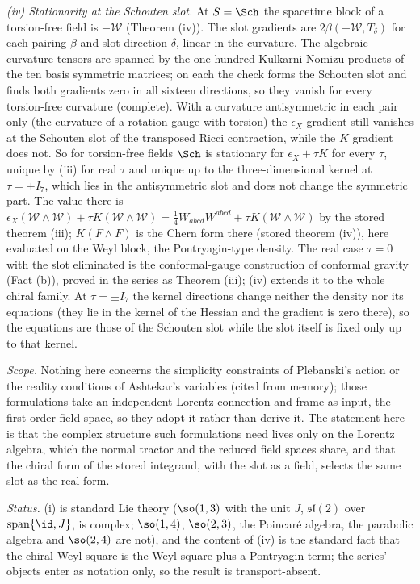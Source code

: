 \emph{(iv) Stationarity at the Schouten slot.} At $S = \Sch$ the spacetime block of a torsion-free field is $-\mathcal{W}$ (Theorem (iv)). The slot gradients are $2\beta(-\mathcal{W}, T_{\delta})$ for each pairing $\beta$ and slot direction $\delta$, linear in the curvature. The algebraic curvature tensors are spanned by the one hundred Kulkarni-Nomizu products of the ten basis symmetric matrices; on each the check forms the Schouten slot and finds both gradients zero in all sixteen directions, so they vanish for every torsion-free curvature (complete). With a curvature antisymmetric in each pair only (the curvature of a rotation gauge with torsion) the $\epsilon_{X}$ gradient still vanishes at the Schouten slot of the transposed Ricci contraction, while the $K$ gradient does not. So for torsion-free fields $\Sch$ is stationary for $\epsilon_{X} + \tau K$ for every $\tau$, unique by (iii) for real $\tau$ and unique up to the three-dimensional kernel at $\tau = \pm I_{7}$, which lies in the antisymmetric slot and does not change the symmetric part. The value there is $\epsilon_{X}(\mathcal{W} \wedge \mathcal{W}) + \tau K(\mathcal{W} \wedge \mathcal{W}) = \tfrac14 W_{abcd}W^{abcd} + \tau K(\mathcal{W} \wedge \mathcal{W})$ by the stored theorem (iii); $K(F \wedge F)$ is the Chern form there (stored theorem (iv)), here evaluated on the Weyl block, the Pontryagin-type density. The real case $\tau = 0$ with the slot eliminated is the conformal-gauge construction of conformal gravity (Fact (b)), proved in the series as Theorem (iii); (iv) extends it to the whole chiral family. At $\tau = \pm I_{7}$ the kernel directions change neither the density nor its equations (they lie in the kernel of the Hessian and the gradient is zero there), so the equations are those of the Schouten slot while the slot itself is fixed only up to that kernel.

\emph{Scope.} Nothing here concerns the simplicity constraints of Plebanski's action or the reality conditions of Ashtekar's variables (cited from memory); those formulations take an independent Lorentz connection and frame as input, the first-order field space, so they adopt it rather than derive it. The statement here is that the complex structure such formulations need lives only on the Lorentz algebra, which the normal tractor and the reduced field spaces share, and that the chiral form of the stored integrand, with the slot as a field, selects the same slot as the real form.

\emph{Status.} (i) is standard Lie theory ($\so(1,3)$ with the unit $J$, $\mathfrak{sl}(2)$ over $\mathrm{span}\{\id, J\}$, is complex; $\so(1,4)$, $\so(2,3)$, the Poincar\'e algebra, the parabolic algebra and $\so(2,4)$ are not), and the content of (iv) is the standard fact that the chiral Weyl square is the Weyl square plus a Pontryagin term; the series' objects enter as notation only, so the result is transport-absent.
